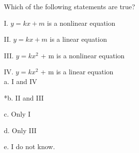  
Which of the following statements are true? 

	I. $y=kx + m$ is a nonlinear equation

	II. $y=kx + m$ is a linear equation

	III. $y=kx^2$  + m is a nonlinear equation

	IV. $y=kx^2$  + m is a linear equation \\

a. I and IV

*b. II and III

c.  Only I

d. Only III

e. I do not know. \\
